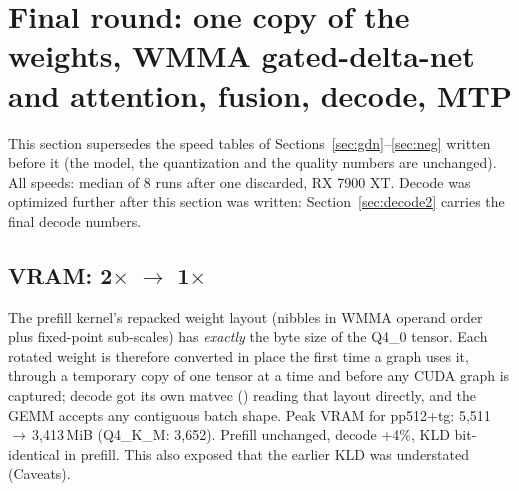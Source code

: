 \documentclass[10pt,a4paper]{article}
\newcommand{\tx}[1]{\texttt{\detokenize{#1}}}
\begin{document}
\section{Final round: one copy of the weights, WMMA gated-delta-net and attention, fusion, decode, MTP}
\label{sec:final}
This section supersedes the speed tables of Sections~\ref{sec:gdn}--\ref{sec:neg} written before it (the model, the
quantization and the quality numbers are unchanged). All speeds: median of 8 \tx{llama-bench} runs after one discarded, RX 7900 XT. Decode was optimized further after this section was written: Section~\ref{sec:decode2} carries the final decode numbers.

\subsection{VRAM: 2$\times$ $\to$ 1$\times$}
The prefill kernel's repacked weight layout (nibbles in WMMA operand order plus fixed-point sub-scales) has \emph{exactly} the byte
size of the Q4\_0 tensor. Each rotated weight is therefore converted in place the first time a graph uses it, through a temporary copy
of one tensor at a time and before any CUDA graph is captured; decode got its own matvec (\tx{k_mv}) reading that layout directly, and
the GEMM accepts any contiguous batch shape. Peak VRAM for pp512+tg: 5{,}511\,$\to$\,3{,}413\,MiB (Q4\_K\_M: 3{,}652). Prefill
unchanged, decode +4\%, KLD bit-identical in prefill. This also exposed that the earlier \tx{fast} KLD was understated (Caveats).
\end{document}
